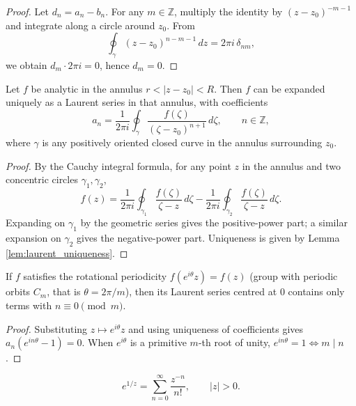 \begin{proof}
Let $d_n = a_n - b_n$. For any $m \in \mathbb{Z}$, multiply the identity by $(z-z_0)^{-m-1}$ and integrate along a circle around $z_0$. From
\[
\oint_\gamma (z-z_0)^{n-m-1}\,dz = 2\pi i\, \delta_{nm},
\]
we obtain $d_m \cdot 2\pi i = 0$, hence $d_m = 0$.
\end{proof}

\begin{theorem}\label{thm:laurent_expansion}
Let $f$ be analytic in the annulus $r < |z - z_0| < R$. Then $f$ can be expanded uniquely as a Laurent series in that annulus, with coefficients
\[
a_n = \frac{1}{2\pi i} \oint_{\gamma} \frac{f(\zeta)}{(\zeta - z_0)^{n+1}}\, d\zeta, \qquad n \in \mathbb{Z},
\]
where $\gamma$ is any positively oriented closed curve in the annulus surrounding $z_0$.
\end{theorem}

\begin{proof}
By the Cauchy integral formula, for any point $z$ in the annulus and two concentric circles $\gamma_1, \gamma_2$,
\[
f(z) = \frac{1}{2\pi i}\oint_{\gamma_1} \frac{f(\zeta)}{\zeta - z}\,d\zeta - \frac{1}{2\pi i}\oint_{\gamma_2} \frac{f(\zeta)}{\zeta - z}\,d\zeta.
\]
Expanding on $\gamma_1$ by the geometric series gives the positive-power part; a similar expansion on $\gamma_2$ gives the negative-power part. Uniqueness is given by Lemma \ref{lem:laurent_uniqueness}.
\end{proof}

\begin{proposition}\label{prop:laurent_rotation_period}
If $f$ satisfies the rotational periodicity $f(e^{i\theta} z) = f(z)$ (group with periodic orbits $C_m$, that is $\theta = 2\pi/m$), then its Laurent series centred at $0$ contains only terms with $n \equiv 0 \pmod{m}$.
\end{proposition}

\begin{proof}
Substituting $z \mapsto e^{i\theta} z$ and using uniqueness of coefficients gives $a_n (e^{in\theta} - 1) = 0$. When $e^{i\theta}$ is a primitive $m$-th root of unity, $e^{in\theta} = 1 \iff m \mid n$.
\end{proof}

\begin{example}\label{ex:laurent_example}
\[
e^{1/z} = \sum_{n=0}^{\infty} \frac{z^{-n}}{n!}, \qquad |z| > 0.
\]
\end{example}

